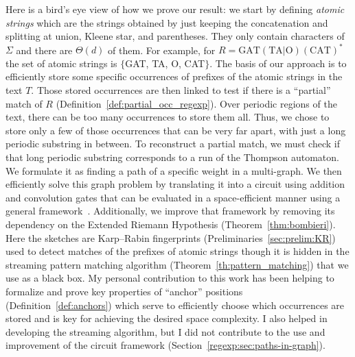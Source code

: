 Here is a bird's eye view of how we prove our result: we start by defining \emph{atomic strings} which are the strings obtained by just keeping the concatenation and splitting at union, Kleene star, and parentheses. They only contain characters of $\Sigma$ and there are $\Theta(d)$ of them. For example, for $R= \mathrm{GAT}(\mathrm{TA} | \mathrm{O})(\mathrm{CAT})^*$  the set of atomic strings is $\{$GAT, TA, O, CAT$\}$.
%
The basis of our approach is to efficiently store some specific occurrences of prefixes of the atomic strings in the text $T$. Those stored occurrences are then linked to test if there is a “partial” match of $R$ (Definition~\ref*{def:partial_occ_regexp}).
Over periodic regions of the text, there can be too many occurrences to store them all.
Thus, we chose to store only a few of those occurrences that can be very far apart, with just a long periodic substring in between. To reconstruct a partial match, we must check if that long periodic substring corresponds to a run of the Thompson automaton. We formulate it as finding a path of a specific weight in a multi-graph. We then efficiently solve this graph problem by translating it into a circuit using addition and convolution gates that can be evaluated in a space-efficient manner using a general framework~\cite{LokshtanovN10,Bringmann17}. Additionally, we improve that framework by removing its dependency on the Extended Riemann Hypothesis (Theorem~\ref{thm:bombieri}). 
Here the sketches are Karp--Rabin fingerprints (Preliminaries~\ref{sec:prelim:KR}) used to detect matches of the prefixes of atomic strings though it is hidden in the streaming pattern matching algorithm (Theorem~\ref{th:pattern_matching}) that we use as a black box.
My personal contribution to this work has been helping to formalize and prove key properties of ``anchor'' positions (Definition~\ref{def:anchors}) which serve to efficiently choose which occurrences are stored and is key for achieving the desired space complexity. I also helped in developing the streaming algorithm, but I did not contribute to the use and improvement of the circuit framework (Section~\ref{regexp:sec:paths-in-graph}).



